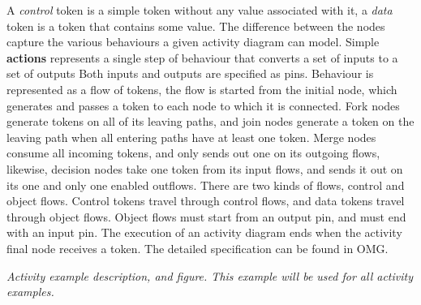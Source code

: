 A \emph{control} token is a simple token without any value associated with it, a \emph{data} token is a token that contains some value. 
The difference between the nodes capture the various behaviours a given activity diagram can model.
Simple \textbf{actions} represents a single step of behaviour that converts a set of inputs to a set of outputs Both inputs and outputs are specified as pins. Behaviour is represented as a flow of tokens, the flow is started from the initial node, which generates and passes a token to each node to which it is connected. Fork nodes generate tokens on all of its leaving paths, and join nodes generate a token on the leaving path when all entering paths have at least one token. Merge nodes consume all incoming tokens, and only sends out one on its outgoing flows, likewise, decision nodes take one token from its input flows, and sends it out on its one and only one enabled outflows.
There are two kinds of flows, control and object flows. Control tokens travel through control flows, and data tokens travel through object flows. Object flows must start from an output pin, and must end with an input pin. The execution of an activity diagram ends when the activity final node receives a token. The detailed specification can be found in OMG\cite{omg_sysml}.

\textit{Activity example description, and figure. This example will be used for all activity examples.}

